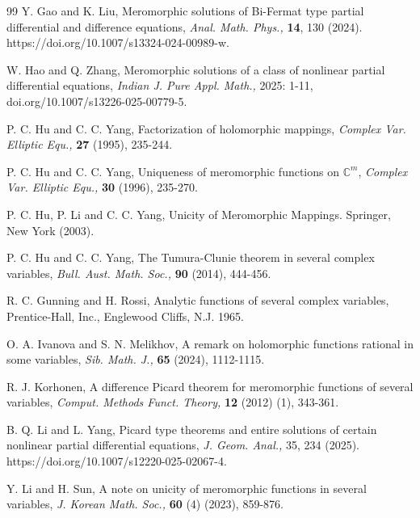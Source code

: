 \documentclass[11pt, reqno]{amsart}
\numberwithin{equation}{section}
\begin{document}
\begin{thebibliography}{99}
 {\sc Y. Gao} and {\sc K. Liu}, Meromorphic solutions of Bi-Fermat type partial differential and difference equations, \textit{Anal. Math. Phys.,} \textbf{14}, 130 (2024). https://doi.org/10.1007/s13324-024-00989-w.


 {\sc W. Hao} and {\sc Q. Zhang}, Meromorphic solutions of a class of nonlinear partial differential equations, \textit{Indian J. Pure Appl. Math.,} 2025: 1-11, doi.org/10.1007/s13226-025-00779-5.

 {\sc P. C. Hu} and {\sc C. C. Yang}, Factorization of holomorphic mappings, \textit{Complex Var. Elliptic Equ.,} \textbf{27} (1995), 235-244.

 {\sc P. C. Hu} and {\sc C. C. Yang}, Uniqueness of meromorphic functions on $\mathbb{C}^m$, \textit{Complex Var. Elliptic Equ.,} \textbf{30} (1996), 235-270.

 {\sc P. C. Hu}, {\sc P. Li} and {\sc C. C. Yang}, Unicity of Meromorphic Mappings. Springer, New York (2003).

 {\sc P. C. Hu} and {\sc C. C. Yang}, The Tumura-Clunie theorem in several complex variables, \textit{Bull. Aust. Math. Soc.,} \textbf{90} (2014), 444-456.

 {\sc R. C. Gunning} and {\sc H. Rossi}, Analytic functions of several complex variables, Prentice-Hall, Inc., Englewood Cliffs, N.J. 1965.

 {\sc O. A. Ivanova} and {\sc S. N. Melikhov}, A remark on holomorphic functions rational in some variables, \textit{Sib. Math. J.,} \textbf{65} (2024), 1112-1115.

 {\sc R. J. Korhonen}, A difference Picard theorem for meromorphic functions of several variables, \textit{Comput. Methods Funct. Theory,}  \textbf{12} (2012) (1), 343-361.

 {\sc B. Q. Li} and {\sc L. Yang}, Picard type theorems and entire solutions of certain nonlinear partial differential equations, \textit{J. Geom. Anal.,} 35, 234 (2025). https://doi.org/10.1007/s12220-025-02067-4.

 {\sc Y. Li} and {\sc H. Sun}, A note on unicity of meromorphic functions in several variables, \textit{J. Korean Math. Soc.,} \textbf{60} (4) (2023), 859-876.


\end{thebibliography}
\end{document}
